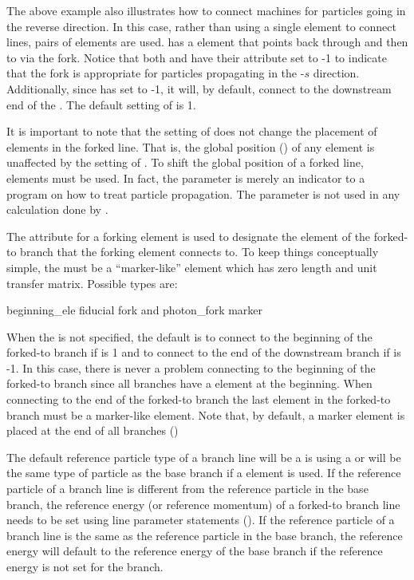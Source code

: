 The above example also illustrates how to connect machines for particles going in the reverse
direction. In this case, rather than using a single  element to connect lines, pairs of
 elements are used.  has a  element  that points back through
 and then to  via the  fork. Notice that both  and 
have their  attribute set to -1 to indicate that the fork is appropriate for particles
propagating in the -$s$ direction. Additionally, since  has  set to -1, it
will, by default, connect to the downstream end of the . The default setting of
 is 1.

It is important to note that the setting of  does not change the placement of elements
in the forked line. That is, the global position () of any element is unaffected by
the setting of . To shift the global position of a forked line, 
elements must be used. In fact, the  parameter is merely an indicator to a program on
how to treat particle propagation. The  parameter is not used in any calculation done
by \bmad.

The  attribute for a forking element is used to designate the element of the forked-to
branch that the forking element connects to. To keep things conceptually simple, the 
must be a ``marker-like'' element which has zero length and unit transfer matrix. Possible
 types are:
\begin{example}
  beginning_ele
  fiducial
  fork and photon_fork
  marker
\end{example}
When the  is not specified, the default is to connect to the beginning of the forked-to
branch if  is 1 and to connect to the end of the downstream branch if  is
-1. In this case, there is never a problem connecting to the beginning of the forked-to branch since
all branches have a  element at the beginning. When connecting to the end of the
forked-to branch the last element in the forked-to branch must be a marker-like element. Note that, by
default, a marker element is placed at the end of all branches ()

The default reference particle type of a branch line will be a  is using a
 or will be the same type of particle as the base branch if a  element is
used. If the reference particle of a branch line is different from the reference particle in the
base branch, the reference energy (or reference momentum) of a forked-to branch line needs to be set
using line parameter statements (). If the reference particle of a branch line is
the same as the reference particle in the base branch, the reference energy will default to the
reference energy of the base branch if the reference energy is not set for the branch.

